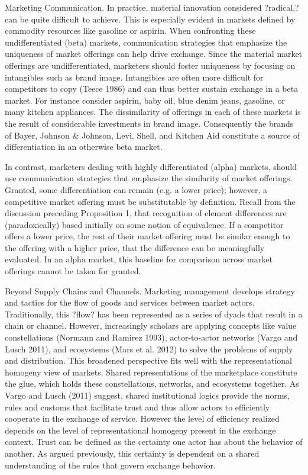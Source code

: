 Marketing Communication. 
In practice, material innovation considered ?radical,? can be quite difficult to achieve. This is especially evident in markets defined by commodity resources like gasoline or aspirin.  When confronting these undifferentiated (beta) markets, communication strategies that emphasize the uniqueness of market offerings can help drive exchange. Since the material market offerings are undifferentiated, marketers should foster uniqueness by focusing on intangibles such as brand image. Intangibles are often more difficult for competitors to copy (Teece 1986) and can thus better sustain exchange in a beta market. For instance consider aspirin, baby oil, blue denim jeans, gasoline, or many kitchen appliances. The dissimilarity of offerings in each of these markets is the result of considerable investments in brand image. Consequently the brands of Bayer, Johnson \& Johnson, Levi, Shell, and Kitchen Aid constitute a source of differentiation in an otherwise beta market. 

In contrast, marketers dealing with highly differentiated (alpha) markets, should use communication strategies that emphasize the similarity of market offerings. Granted, some differentiation can remain (e.g. a lower price); however, a competitive market offering must be substitutable by definition. Recall from the discussion preceding Proposition 1, that recognition of element differences are (paradoxically) based initially on some notion of equivalence. If a competitor offers a lower price, the rest of their market offering must be similar enough to the offering with a higher price, that the difference can be meaningfully evaluated. In an alpha market, this baseline for comparison across market offerings cannot be taken for granted.

Beyond Supply Chains and Channels. 
Marketing management develops strategy and tactics for the flow of goods and services between market actors. Traditionally, this ?flow? has been represented as a series of dyads that result in a chain or channel. However, increasingly scholars are applying concepts like value constellations (Normann and Ramirez 1993), actor-to-actor networks (Vargo and Lusch 2011), and ecosystems (Mars et al. 2012) to solve the problems of supply and distribution. This broadened perspective fits well with the representational homogeny view of markets. Shared representations of the marketplace constitute the glue, which holds these constellations, networks, and ecosystems together. As Vargo and Lusch (2011) suggest, shared institutional logics provide the norms, rules and customs that facilitate trust and thus allow actors to efficiently cooperate in the exchange of service. However the level of efficiency realized depends on the level of representational homogeny present in the exchange context. Trust can be defined as the certainty one actor has about the behavior of another. As argued previously, this certainty is dependent on a shared understanding of the rules that govern exchange behavior. 

